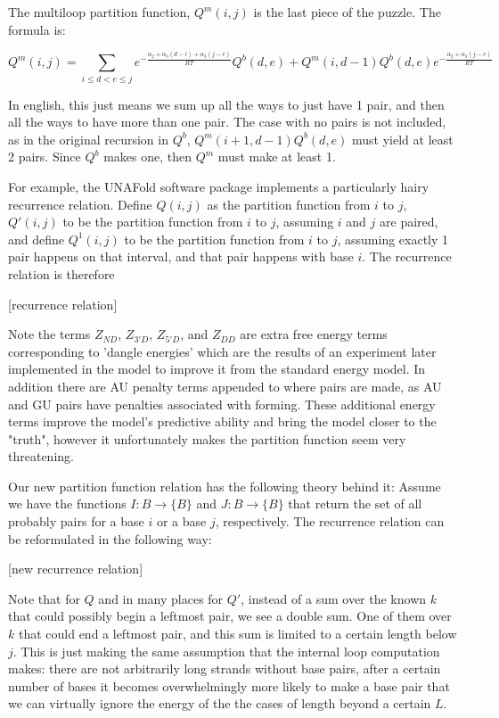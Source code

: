The multiloop partition function, $Q^m(i, j)$ is the last piece of the
puzzle. The formula is:

\begin{equation} Q^m(i, j) = \sum_{i \leq d < e \leq j}
e^{-\frac{\alpha_2 + \alpha_3(d-i) + \alpha_3(j-e)}{RT}} Q^b(d,e) +
Q^m(i, d - 1)Q^b(d, e) e^{-\frac{\alpha_2 + \alpha_3(j-e)}{RT}}
\end{equation}

In english, this just means we sum up all the ways to just have 1
pair, and then all the ways to have more than one pair. The case with
no pairs is not included, as in the original recursion in $Q^b$,
$Q^m(i+1, d-1)Q^b(d,e)$ must yield at least 2 pairs. Since $Q^b$ makes
one, then $Q^m$ must make at least 1.

For example, the UNAFold software package implements a particularly
hairy recurrence relation. Define $Q(i,j)$ as the partition function
from $i$ to $j$, $Q'(i,j)$ to be the partition function from $i$ to
$j$, assuming $i$ and $j$ are paired, and define $Q^1(i,j)$ to be the
partition function from $i$ to $j$, assuming exactly 1 pair happens on
that interval, and that pair happens with base $i$. The recurrence
relation is therefore

[recurrence relation]

Note the terms $Z_{ND}$, $Z_{3'D}$, $Z_{5'D}$, and $Z_{DD}$ are extra
free energy terms corresponding to 'dangle energies' which are the
results of an experiment later implemented in the model to improve it
from the standard energy model. In addition there are AU penalty terms
appended to where pairs are made, as AU and GU pairs have penalties
associated with forming. These additional energy terms improve the
model's predictive ability and bring the model closer to the "truth",
however it unfortunately makes the partition function seem very
threatening.

Our new partition function relation has the following theory behind
it: Assume we have the functions $I : B \to \{B\}$ and $J : B \to
\{B\}$ that return the set of all probably pairs for a base $i$ or a
base $j$, respectively. The recurrence relation can be reformulated in
the following way:

[new recurrence relation]

Note that for $Q$ and in many places for $Q'$, instead of a sum over
the known $k$ that could possibly begin a leftmost pair, we see a
double sum. One of them over $k$ that could end a leftmost pair, and
this sum is limited to a certain length below $j$. This is just making
the same assumption that the internal loop computation makes: there
are not arbitrarily long strands without base pairs, after a certain
number of bases it becomes overwhelmingly more likely to make a base
pair that we can virtually ignore the energy of the the cases of
length beyond a certain $L$.

